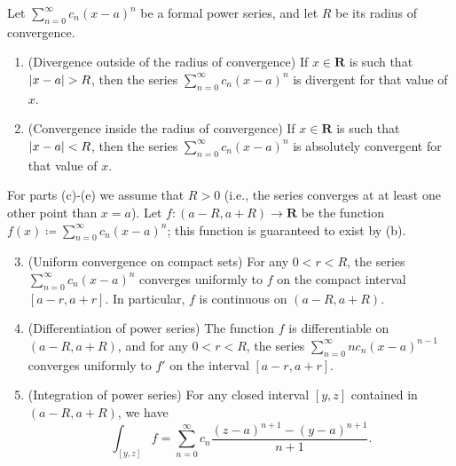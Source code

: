 \setcounter{theorem}{5}
\begin{theorem}\label{4.1.6}
    Let \(\sum_{n = 0}^\infty c_n (x - a)^n\) be a formal power series, and let \(R\) be its radius of convergence.
    \begin{enumerate}
        \item (Divergence outside of the radius of convergence)
              If \(x \in \mathbf{R}\) is such that \(\abs*{x - a} > R\), then the series \(\sum_{n = 0}^\infty c_n (x - a)^n\) is divergent for that value of \(x\).
        \item (Convergence inside the radius of convergence)
              If \(x \in \mathbf{R}\) is such that \(\abs*{x - a} < R\), then the series \(\sum_{n = 0}^\infty c_n (x - a)^n\) is absolutely convergent for that value of \(x\).
    \end{enumerate}
    For parts (c)-(e) we assume that \(R > 0\)
    (i.e., the series converges at at least one other point than \(x = a\)).
    Let \(f : (a - R, a + R) \to \mathbf{R}\) be the function \(f(x) \coloneqq \sum_{n = 0}^\infty c_n (x - a)^n\);
    this function is guaranteed to exist by (b).
    \begin{enumerate}
        \setcounter{enumi}{2}
        \item (Uniform convergence on compact sets)
              For any \(0 < r < R\), the series \(\sum_{n = 0}^\infty c_n (x - a)^n\) converges uniformly to \(f\) on the compact interval \([a - r, a + r]\).
              In particular, \(f\) is continuous on \((a - R, a + R)\).
        \item (Differentiation of power series)
              The function \(f\) is differentiable on \((a - R, a + R)\), and for any \(0 < r < R\), the series \(\sum_{n = 0}^\infty n c_n (x - a)^{n - 1}\) converges uniformly to \(f'\) on the interval \([a - r, a + r]\).
        \item (Integration of power series)
              For any closed interval \([y, z]\) contained in \((a - R, a + R)\), we have
              \[
                  \int_{[y, z]} f = \sum_{n = 0}^\infty c_n \frac{(z - a)^{n + 1} - (y - a)^{n + 1}}{n + 1}.
              \]
    \end{enumerate}
\end{theorem}

